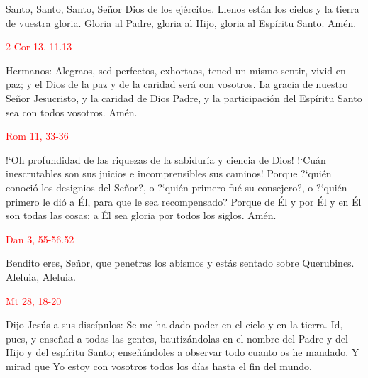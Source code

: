 \documentclass[10pt]{article}
\begin{document}
\begin{multicols}{2}
      Santo, Santo, Santo, Señor Dios de los ejércitos. Llenos están los cielos y la tierra de vuestra gloria. Gloria al Padre, gloria al Hijo, gloria al Espíritu Santo. Amén.\newline

      \hfill\textcolor{red}{2 Cor 13, 11.13}

      Hermanos: Alegraos, sed perfectos, exhortaos, tened un mismo sentir, vivid en paz; y el Dios de la paz y de la caridad será con vosotros. La gracia de nuestro Señor Jesucristo,
      y la caridad de Dios Padre, y la participación del Espíritu Santo sea con todos vosotros. Amén.\newline

      \hfill\textcolor{red}{Rom 11, 33-36}

      {!`}Oh profundidad de las riquezas de la sabiduría y ciencia de Dios! {!`}Cuán inescrutables son sus juicios e incomprensibles sus caminos! Porque {?`}quién conoció los designios del Señor?,
      o {?`}quién primero fué su consejero?, o {?`}quién primero le dió a Él, para que le sea recompensado? Porque de Él y por Él y en Él son todas las cosas; a Él sea gloria por todos los siglos.
      Amén.\newline

      \hfill\textcolor{red}{Dan 3, 55-56.52}

      Bendito eres, Señor, que penetras los abismos y estás sentado sobre Querubines.
      Aleluia, Aleluia.\newline

      \hfill\textcolor{red}{Mt 28, 18-20}

      Dijo Jesús a sus discípulos: Se me ha dado poder en el cielo y en la tierra. Id, pues, y enseñad a todas las gentes, bautizándolas en el nombre del Padre y del Hijo y del espíritu
      Santo; enseñándoles a observar todo cuanto os he mandado. Y mirad que Yo estoy con vosotros todos los días hasta el fin del mundo.\newline

      \begin{otherlanguage}{latin}
            

            

            
      \end{otherlanguage}
      \newline


\end{multicols}
\end{document}
